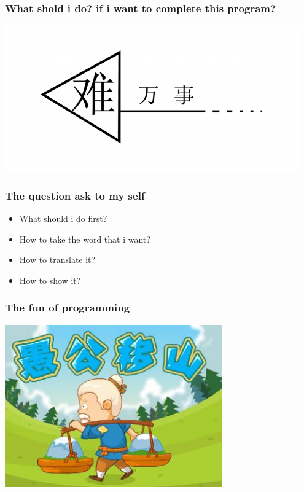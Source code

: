 \documentclass[10pt]{beamer}
\begin{document}
\begin{frame}
  \frametitle{What shold i do? if i want to complete this program?}
\begin{center} 
  \includegraphics[width=1.\textwidth]{myfirststep.jpg}

\end{center}

\end{frame}
\begin{frame}
  \frametitle{The question ask to my self}
\begin{itemize}
  \item What should i do first?
  \item How to take the word that i want?
  \item How to translate it?
  \item How to show it?
\end{itemize}
\end{frame}

\begin{frame}
  \frametitle{The fun of programming}
  
\begin{center} 
  \includegraphics[width=0.7\textwidth]{challenge.jpg}

\end{center}

\end{frame}
\end{document}
